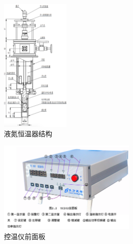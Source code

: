 \documentclass{spaexp}
\begin{document}
                \begin{figure}
                    \ct
                    \caption{液氮恒温器结构}
                    \label{img:液氮恒温器结构}
                    \includegraphics[width = 0.3\textwidth]{TempertureKeeper.png}
                \end{figure}
                \begin{figure}
                    \ct
                    \caption{控温仪前面板}
                    \label{img:控温仪前面板}
                    \includegraphics[width = 0.6\textwidth]{PIDFront.png}
                \end{figure}
\end{document}
